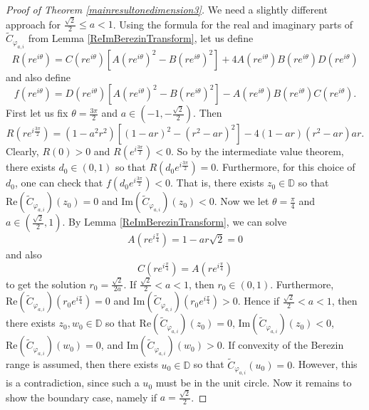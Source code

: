 \documentclass{amsart}
\theoremstyle{remark}
\begin{document}
\begin{proof}[Proof of Theorem \ref{mainresultonedimension3}]
We need a slightly different approach for 
$\frac{\sqrt{2}}{2}\leq a<1$. Using the formula for the real and imaginary parts of 
$\widetilde{C}_{\varphi_{a,i}}$ from Lemma \ref{ReImBerezinTransform}, let us define
\[R(re^{i\theta})=C(re^{i\theta})[A(re^{i\theta})^2-B(re^{i\theta})^2]+4A(re^{i\theta})B(re^{i\theta})D(re^{i\theta})\]
and also define
\[f(re^{i\theta})=D(re^{i\theta})[A(re^{i\theta})^2-B(re^{i\theta})^2]-A(re^{i\theta})B(re^{i\theta})C(re^{i\theta}).\]
First let us fix $\theta=\frac{3\pi}{2}$ and $a\in (-1,-\frac{\sqrt{2}}{2})$.  
Then \[R(re^{i\frac{3\pi}{2}})=(1-a^2r^2)[(1-ar)^2-(r^2-ar)^2]-4(1-ar)(r^2-ar)ar.\]
Clearly, $R(0)>0$ and $R(e^{i\frac{3\pi}{2}})<0$.  So by the intermediate value theorem, there exists $d_0\in (0,1)$ so that $R\left(d_0e^{i\frac{3\pi}{2}}\right)=0$.  Furthermore, for this choice of $d_0$, one can check that
$f\left(d_0e^{i\frac{3\pi}{2}}\right)<0$.  That is,
there exists $z_0\in \mathbb{D}$ so that
$\mathrm{Re}(\widetilde{C}_{\varphi_{a,i}})(z_0)=0$ and
$\mathrm{Im}(\widetilde{C}_{\varphi_{a,i}})(z_0)<0$.  Now 
we let $\theta=\frac{\pi}{4}$ and $a\in (\frac{\sqrt{2}}{2},1)$.  By Lemma \ref{ReImBerezinTransform}, we can solve 
\[A(re^{i\frac{\pi}{4}})=1-ar\sqrt{2}=0\] and also
\[C(re^{i\frac{\pi}{4}})=A(re^{i\frac{\pi}{4}})\] to get the solution
$r_0=\frac{\sqrt{2}}{2a}$.  If $\frac{\sqrt{2}}{2}<a<1$, then
$r_0\in (0,1)$.  Furthermore,
$\mathrm{Re}(\widetilde{C}_{\varphi_{a,i}})(r_0e^{i\frac{\pi}{4}})=0$ and
$\mathrm{Im}(\widetilde{C}_{\varphi_{a,i}})(r_0e^{i\frac{\pi}{4}})>0$.  Hence if $\frac{\sqrt{2}}{2}<a<1$, then there exists $z_0,w_0\in \mathbb{D}$ so that
$\mathrm{Re}(\widetilde{C}_{\varphi_{a,i}})(z_0)=0$, $\mathrm{Im}(\widetilde{C}_{\varphi_{a,i}})(z_0)<0$,
 $\mathrm{Re}(\widetilde{C}_{\varphi_{a,i}})(w_0)=0$, and
$\mathrm{Im}(\widetilde{C}_{\varphi_{a,i}})(w_0)>0$.  If convexity of the Berezin range is assumed, then there exists $u_0\in \mathbb{D}$ so that $\widetilde{C}_{\varphi_{a,i}}(u_0)=0$.  However, this is a contradiction, since such a $u_0$ must be in the unit circle.  Now it remains to show the boundary case, namely if $a=\frac{\sqrt{2}}{2}$.


\end{proof}
\end{document}
